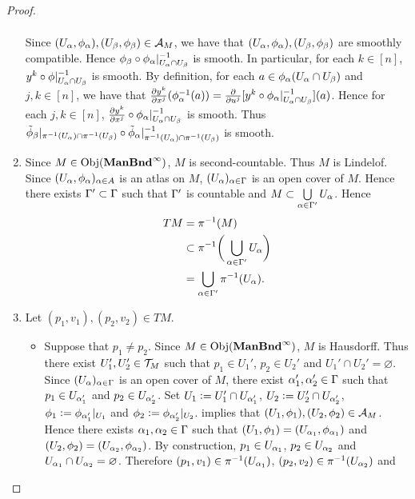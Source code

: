 \documentclass{book}
\begin{document}
\begin{proof}
\begin{enumerate}[label=(\alph*)]
\begin{align*}
		\end{align*}
		Since $(U_{\alpha}, \phi_{\alpha}), (U_{\beta}, \phi_{\beta}) \in \mathcal{A}_M$, we have that $(U_{\alpha}, \phi_{\alpha}), (U_{\beta}, \phi_{\beta})$ are smoothly compatible. Hence $\phi_{\beta} \circ \phi_{\alpha}|^{-1}_{U_{\alpha} \cap U_{\beta}}$ is smooth. In particular, for each $k \in [n]$, $y^k \circ \phi|_{U_{\alpha} \cap U_{\beta}}^{-1}$ is smooth. By definition, for each $a \in \phi_{\alpha}(U_{\alpha} \cap U_{\beta})$ and $j,k \in [n]$, we have that $\frac{\partial y^k}{\partial x^j}(\phi_{\alpha}^{-1}(a)) = \frac{\partial}{\partial u^j} [y^k \circ \phi_{\alpha}|_{U_{\alpha} \cap U_{\beta}}^{-1}](a)$. Hence for each $j,k \in [n]$, $\frac{\partial y^k}{\partial x^j} \circ \phi_{\alpha}|_{U_{\alpha} \cap U_{\beta}}^{-1}$ is smooth. Thus $\tilde{\phi}_{\beta}|_{\pi^{-1}(U_{\alpha}) \cap \pi^{-1}(U_{\beta})} \circ \tilde{\phi}_{\alpha}|_{\pi^{-1}(U_{\alpha}) \cap \pi^{-1}(U_{\beta})}^{-1}$ is smooth.
		\item Since $M \in \operatorname{Obj}(\operatorname*{\text{\textbf{ManBnd}}^{\infty}})$, $M$ is second-countable. Thus $M$ is Lindelof. Since $(U_{\alpha}, \phi_{\alpha})_{\alpha \in A}$ is an atlas on $M$, $(U_{\alpha})_{\alpha \in \Gamma}$ is an open cover of $M$. Hence there exists $\Gamma' \subset \Gamma$ such that $\Gamma'$ is countable and $M \subset \bigcup\limits_{\alpha \in \Gamma'} U_{\alpha}$. Hence 
		\begin{align*}
			TM
			& = \pi^{-1}(M) \\
			& \subset \pi^{-1} \bigg( \bigcup\limits_{\alpha \in \Gamma'} U_{\alpha} \bigg) \\
			& = \bigcup\limits_{\alpha \in \Gamma'} \pi^{-1}(U_{\alpha}).
		\end{align*}
		\item Let $(p_1, v_1), (p_2, v_2) \in TM$. 
		\begin{itemize}
			\item Suppose that $p_1 \neq p_2$. Since $M \in \operatorname{Obj}(\operatorname*{\text{\textbf{ManBnd}}^{\infty}})$, $M$ is Hausdorff. Thus there exist $U_1', U_2' \in \mathcal{T}_M$ such that $p_1 \in U_1'$, $p_2 \in U_2'$ and $U_1' \cap U_2' = \varnothing$. Since $(U_{\alpha})_{\alpha \in \Gamma}$ is an open cover of $M$, there exist $\alpha_1', \alpha_2' \in \Gamma$ such that $p_1 \in U_{\alpha_1'}$ and $p_2 \in U_{\alpha_2'}$. Set $U_1 \vcentcolon= U_1' \cap U_{\alpha_1'}$, $U_2 \vcentcolon= U_2' \cap U_{\alpha_2'}$, $\phi_1 \vcentcolon= \phi_{\alpha_1'}|_{U_1}$ and $\phi_2 \vcentcolon= \phi_{\alpha_2'}|_{U_2}$.   implies that $(U_1, \phi_1), (U_2, \phi_2) \in \mathcal{A}_M$. Hence there exists $\alpha_1, \alpha_2 \in \Gamma$ such that $(U_1, \phi_1) = (U_{\alpha_1}, \phi_{\alpha_1})$ and $(U_2, \phi_2) = (U_{\alpha_2}, \phi_{\alpha_2})$. By construction, $p_1 \in U_{\alpha_1}$, $p_2 \in U_{\alpha_2}$ and $U_{\alpha_1} \cap U_{\alpha_2} = \varnothing$. Therefore $(p_1, v_1) \in \pi^{-1}(U_{\alpha_1})$, $(p_2, v_2) \in \pi^{-1}(U_{\alpha_2})$ and 

\end{itemize}
\end{enumerate}
\end{proof}
\end{document}
